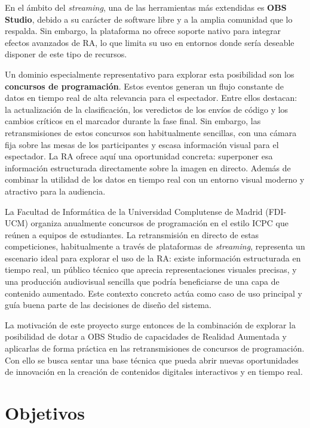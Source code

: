     En el ámbito del \textit{streaming}, una de las herramientas más extendidas es \textbf{OBS Studio}, debido a su carácter de software libre y a la amplia comunidad que lo respalda. Sin embargo, la plataforma no ofrece soporte nativo para integrar efectos avanzados de RA, lo que limita su uso en entornos donde sería deseable disponer de este tipo de recursos.
    
    Un dominio especialmente representativo para explorar esta posibilidad son los \textbf{concursos de programación}. Estos eventos generan un flujo constante de datos en tiempo real de alta relevancia para el espectador. Entre ellos destacan: la actualización de la clasificación, los veredictos de los envíos de código y los cambios críticos en el marcador durante la fase final. Sin embargo, las retransmisiones de estos concursos son habitualmente sencillas, con una cámara fija sobre las mesas de los participantes y escasa información visual para el espectador. La RA ofrece aquí una oportunidad concreta: superponer esa información estructurada directamente sobre la imagen en directo. Además de combinar la utilidad de los datos en tiempo real con un entorno visual moderno y atractivo para la audiencia.
    
    La Facultad de Informática de la Universidad Complutense de Madrid (FDI-UCM) organiza anualmente concursos de programación en el estilo ICPC que reúnen a equipos de estudiantes. La retransmisión en directo de estas competiciones, habitualmente a través de plataformas de \textit{streaming}, representa un escenario ideal para explorar el uso de la RA: existe información estructurada en tiempo real, un público técnico que aprecia representaciones visuales precisas, y una producción audiovisual sencilla que podría beneficiarse de una capa de contenido aumentado. Este contexto concreto actúa como caso de uso principal y guía buena parte de las decisiones de diseño del sistema.
    
    La motivación de este proyecto surge entonces de la combinación de explorar la posibilidad de dotar a OBS Studio de capacidades de Realidad Aumentada y aplicarlas de forma práctica en las retransmisiones de concursos de programación. Con ello se busca sentar una base técnica que pueda abrir nuevas oportunidades de innovación en la creación de contenidos digitales interactivos y en tiempo real.
    
    \section{Objetivos}
    
